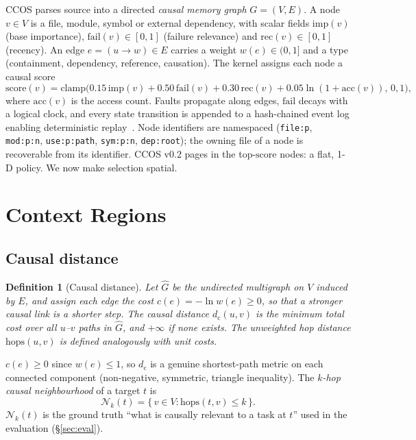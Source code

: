 \documentclass[11pt]{article}
\newtheorem{definition}{Definition}
\newcommand{\dcausal}{d_{\mathrm{c}}}
\newcommand{\Nk}{\mathcal{N}_k}
\newcommand{\code}[1]{\texttt{#1}}
\begin{document}
CCOS parses source into a directed \emph{causal memory graph} $G=(V,E)$. A node
$v\in V$ is a file, module, symbol or external dependency, with scalar fields
$\mathrm{imp}(v)$ (base importance), $\mathrm{fail}(v)\in[0,1]$ (failure
relevance) and $\mathrm{rec}(v)\in[0,1]$ (recency). An edge $e=(u\!\to\!w)\in E$
carries a weight $w(e)\in(0,1]$ and a type (containment, dependency, reference,
causation). The kernel assigns each node a causal score
\begin{equation}
\mathrm{score}(v) = \mathrm{clamp}\big(0.15\,\mathrm{imp}(v) + 0.50\,\mathrm{fail}(v)
  + 0.30\,\mathrm{rec}(v) + 0.05\ln(1{+}\mathrm{acc}(v)),\,0,1\big),
\label{eq:score}
\end{equation}
where $\mathrm{acc}(v)$ is the access count. Faults propagate along edges,
$\mathrm{fail}$ decays with a logical clock, and every state transition is
appended to a hash-chained event log enabling deterministic
replay~\cite{haber1991timestamp}. Node identifiers are namespaced
(\code{file:p}, \code{mod:p:n}, \code{use:p:path}, \code{sym:p:n},
\code{dep:root}); the owning file of a node is recoverable from its identifier.
CCOS v0.2 pages in the top-$\mathrm{score}$ nodes: a flat, 1-D policy. We now
make selection spatial.

\section{Context Regions}\label{sec:regions}

\subsection{Causal distance}

\begin{definition}[Causal distance]
Let $\hat G$ be the undirected multigraph on $V$ induced by $E$, and assign each
edge the cost $c(e) = -\ln w(e) \ge 0$, so that a stronger causal link is a
shorter step. The \emph{causal distance} $\dcausal(u,v)$ is the minimum total
cost over all $u$--$v$ paths in $\hat G$, and $+\infty$ if none exists. The
unweighted hop distance $\mathrm{hops}(u,v)$ is defined analogously with unit
costs.
\end{definition}

$c(e)\ge 0$ since $w(e)\le 1$, so $\dcausal$ is a genuine shortest-path metric on
each connected component (non-negative, symmetric, triangle inequality). The
\emph{$k$-hop causal neighbourhood} of a target $t$ is
\begin{equation}
\Nk(t) = \{\, v \in V : \mathrm{hops}(t,v) \le k \,\}.
\end{equation}
$\Nk(t)$ is the ground truth ``what is causally relevant to a task at $t$'' used
in the evaluation (\S\ref{sec:eval}).
\end{document}
